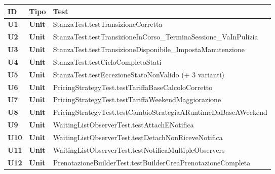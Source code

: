 \begin{table}[htbp]
    \centering
    \small
    \renewcommand{\arraystretch}{1.15}
    \begin{tabularx}{\textwidth}{|>{\bfseries}l|>{\bfseries}l|>{\raggedright\arraybackslash}X|}
        \hline
        ID & Tipo & Test \\ \hline
        U1 & Unit & {\ttfamily\footnotesize StanzaTest.\newline testTransizioneCorretta} \\ \hline
        U2 & Unit & {\ttfamily\footnotesize StanzaTest.\newline testTransizioneInCorso\_TerminaSessione\_VaInPulizia} \\ \hline
        U3 & Unit & {\ttfamily\footnotesize StanzaTest.\newline testTransizioneDisponibile\_ImpostaManutenzione} \\ \hline
        U4 & Unit & {\ttfamily\footnotesize StanzaTest.\newline testCicloCompletoStati} \\ \hline
        U5 & Unit & {\ttfamily\footnotesize StanzaTest.\newline testEccezioneStatoNonValido (+ 3 varianti)} \\ \hline
        U6 & Unit & {\ttfamily\footnotesize PricingStrategyTest.\newline testTariffaBaseCalcoloCorretto} \\ \hline
        U7 & Unit & {\ttfamily\footnotesize PricingStrategyTest.\newline testTariffaWeekendMaggiorazione} \\ \hline
        U8 & Unit & {\ttfamily\footnotesize PricingStrategyTest.\newline testCambioStrategiaARuntimeDaBaseAWeekend} \\ \hline
        U9 & Unit & {\ttfamily\footnotesize WaitingListObserverTest.\newline testAttachENotifica} \\ \hline
        U10 & Unit & {\ttfamily\footnotesize WaitingListObserverTest.\newline testDetachNonRiceveNotifica} \\ \hline
        U11 & Unit & {\ttfamily\footnotesize WaitingListObserverTest.\newline testNotificaMultipleObservers} \\ \hline
        U12 & Unit & {\ttfamily\footnotesize PrenotazioneBuilderTest.\newline testBuilderCreaPrenotazioneCompleta} \\ \hline

\end{tabularx}
\end{table}

